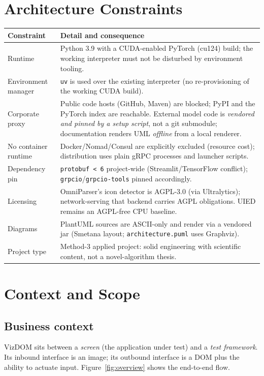 \documentclass[11pt,a4paper]{report}
\newcommand{\code}[1]{\texttt{#1}}
\begin{document}
\chapter{Architecture Constraints}
\begin{longtable}{@{}p{3.6cm}p{11.0cm}@{}}
\toprule
\textbf{Constraint} & \textbf{Detail and consequence} \\
\midrule
\endhead
Runtime & Python 3.9 with a CUDA-enabled PyTorch (cu124) build; the working interpreter must not be disturbed by environment tooling. \\
Environment manager & \code{uv} is used over the existing interpreter (no re-provisioning of the working CUDA build). \\
Corporate proxy & Public code hosts (GitHub, Maven) are blocked; PyPI and the PyTorch index are reachable. External model code is \emph{vendored and pinned by a setup script}, not a git submodule; documentation renders UML \emph{offline} from a local renderer. \\
No container runtime & Docker/Nomad/Consul are explicitly excluded (resource cost); distribution uses plain gRPC processes and launcher scripts. \\
Dependency pin & \code{protobuf < 6} project-wide (Streamlit/TensorFlow conflict); \code{grpcio}/\code{grpcio-tools} pinned accordingly. \\
Licensing & OmniParser's icon detector is AGPL-3.0 (via Ultralytics); network-serving that backend carries AGPL obligations. UIED remains an AGPL-free CPU baseline. \\
Diagrams & PlantUML sources are ASCII-only and render via a vendored jar (Smetana layout; \code{architecture.puml} uses Graphviz). \\
Project type & Method-3 applied project: solid engineering with scientific content, not a novel-algorithm thesis. \\
\bottomrule
\end{longtable}

\chapter{Context and Scope}
\section{Business context}
VizDOM sits between a \emph{screen} (the application under test) and a \emph{test
framework}. Its inbound interface is an image; its outbound interface is a DOM plus
the ability to actuate input. Figure~\ref{fig:overview} shows the end-to-end flow.
\end{document}
